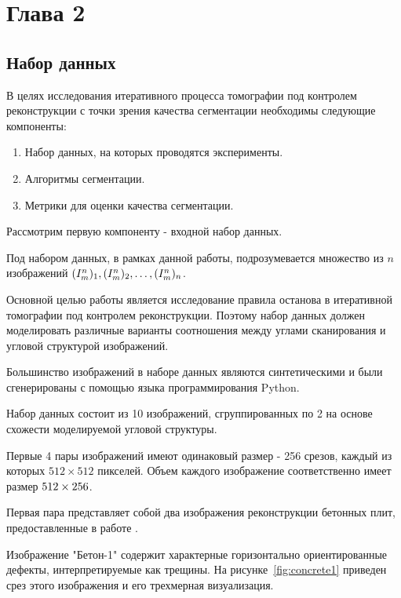 \section{Глава 2}

\subsection{Набор данных}

В целях исследования итеративного процесса томографии под контролем реконструкции с точки зрения качества сегментации необходимы следующие компоненты:
\begin{enumerate}

    \item Набор данных, на которых проводятся эксперименты.
    \item Алгоритмы сегментации.
    \item Метрики для оценки качества сегментации.
        
\end{enumerate}   

Рассмотрим первую компоненту - входной набор данных.

Под набором данных, в рамках данной работы, подрозумевается множество из \(n\) изображений \( (I^n_m)_1, (I^n_m)_2, \ldots, (I^n_m)_n \). 

Основной целью работы является исследование правила останова в итеративной томографии под контролем реконструкции. Поэтому набор данных должен моделировать различные варианты соотношения между углами сканирования и угловой структурой изображений.

Большинство изображений  в наборе данных являются синтетическими и были сгенерированы с помощью языка программирования Python.

Набор данных состоит из 10 изображений, сгруппированных по 2 на основе схожести моделируемой угловой структуры.

Первые 4 пары изображений имеют одинаковый размер - 256 срезов, каждый из которых \(512 \times 512\) пикселей. Объем каждого изображение соответственно имеет размер \(512 \time 512 \times 256\).

Первая пара представляет собой два изображения реконструкции бетонных плит, предоставленные в работе \cite{wagner2023comparative}.

Изображение "Бетон-1" содержит характерные горизонтально ориентированные дефекты, интерпретируемые как трещины. На рисунке~\ref{fig:concrete1} приведен срез этого изображения и его трехмерная визуализация.

